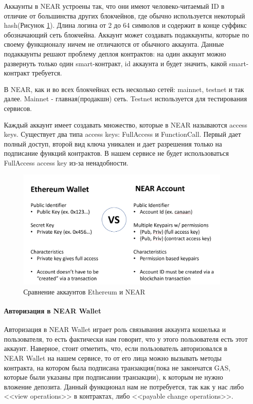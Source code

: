 Аккаунты в NEAR\cite{nearaccounts} устроены так, что они имеют человеко-читаемый ID в отличие от большинства других блокчейнов, где обычно используется некоторый hash(Рисунок {\color{blue} \ref{fig.eth_near_cmp}}). Длина логина от 2 до 64 символов и содержит в конце суффикс обозначающий сеть блокчейна. Аккаунт может создавать подаккаунты, которые по своему функционалу ничем не отличаются от обычного аккаунта. Данные подаккаунты решают проблему деплоя контрактов: на один аккаунт можно развернуть только один smart-контракт, id аккаунта и будет значить, какой smart-контракт требуется.

\begin{definition}
    В NEAR, как и во всех блокчейнах есть несколько сетей: mainnet, testnet и так далее. Mainnet - главная(продакшн) сеть. Testnet используется для тестирования сервисов.
\end{definition}

Каждый аккаунт имеет создавать множество, которые в NEAR называются access keys. Существует два типа access keys: FullAccess и FunctionCall. Первый дает полный доступ, второй вид ключа уникален и дает разрешения только на подписание функций контрактов. В нашем сервисе не будет использоваться FullAccess access key из-за ненадобности.

\begin{figure}
    \centering
    \includegraphics[height=60mm]{fig/eth_near_cmp.png}
    \caption{Сравнение аккаунтов Ethereum и NEAR}
    \label{fig.eth_near_cmp}
\end{figure}

\paragraph{Авторизация в NEAR Wallet}

Авторизация в NEAR Wallet играет роль связывания аккаунта кошелька и пользователя, то есть фактически нам говорит, что у этого пользователя есть этот аккаунт. Наверное, стоит отметить, что, если пользователь авторизовался в NEAR Wallet на нашем сервисе, то от его лица можно вызывать методы контракта, на котором была подписана транзакция(пока не закончатся GAS, которые были указаны при подписании транзакции), к которым не нужно вложение депозита. Данный функционал нам не потребуется, так как у нас либо <<view operations>> в контрактах, либо <<payable change operations>>.

